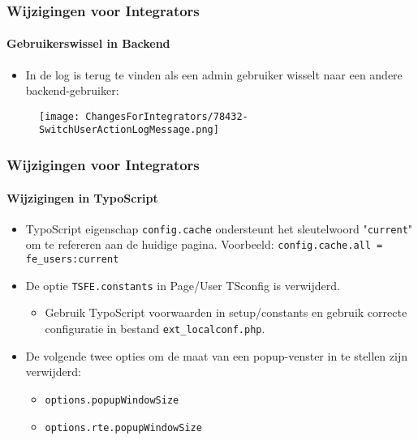 
\begin{frame}[fragile]
	\frametitle{Wijzigingen voor Integrators}
	\framesubtitle{Gebruikerswissel in Backend}

	\begin{itemize}
		\item In de log is terug te vinden als een admin gebruiker wisselt naar een andere backend-gebruiker:
	\end{itemize}

	\begin{figure}
		\texttt{[image: ChangesForIntegrators/78432-SwitchUserActionLogMessage.png]}
	\end{figure}

\end{frame}


\begin{frame}[fragile]
	\frametitle{Wijzigingen voor Integrators}
	\framesubtitle{Wijzigingen in TypoScript}

	\begin{itemize}
		\item TypoScript eigenschap \texttt{config.cache} ondersteunt het sleutelwoord
			"\texttt{current}" om te refereren aan de huidige pagina. Voorbeeld:\newline
			\smaller\texttt{config.cache.all = fe\_users:current}\normalsize

		\item De optie \texttt{TSFE.constants} in Page/User TSconfig is verwijderd.

			\begin{itemize}\smaller
				\item[\ding{228}] Gebruik TypoScript voorwaarden  in setup/constants en gebruik correcte configuratie in bestand \texttt{ext\_localconf.php}.
			\end{itemize}

		\item De volgende twee opties om de maat van een popup-venster in te stellen zijn verwijderd:

			\begin{itemize}
				\item \texttt{options.popupWindowSize}
				\item \texttt{options.rte.popupWindowSize}
			\end{itemize}

	\end{itemize}

\end{frame}

